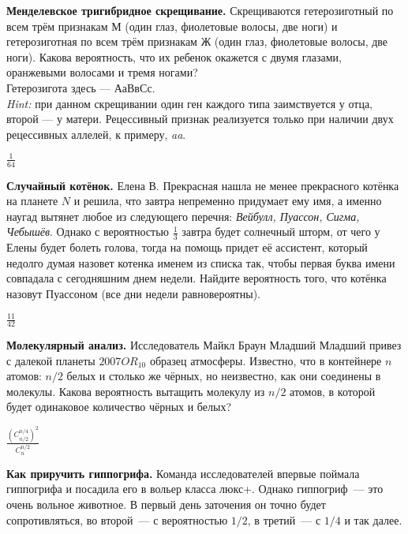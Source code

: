 \documentclass[12pt, addpoints]{exam} %
\begin{document}
\begin{questions}

\question \textbf{Менделевское тригибридное скрещивание.} Скрещиваются гетерозиготный по всем трём признакам М (один глаз, фиолетовые волосы, две ноги) и гетерозиготная по всем трём признакам Ж (один глаз, фиолетовые волосы, две ноги). Какова вероятность, что их ребенок окажется с двумя глазами, оранжевыми волосами и тремя ногами?\\
Гетерозигота здесь --- АаВвСс. \\
{\it Hint:} при данном скрещивании один ген каждого типа заимствуется у отца, второй --- у матери. Рецессивный признак реализуется только при наличии двух рецессивных аллелей, к примеру, {\it aa}.

\begin{solution}
 $\frac{1}{64}$
\end{solution}

\question \textbf{Случайный котёнок.} Елена В. Прекрасная нашла не менее прекрасного котёнка на планете $N$ и решила, что завтра непременно придумает ему имя, а именно наугад вытянет любое из следующего перечня: {\it Вейбулл, Пуассон, Сигма, Чебышёв}.
Однако с вероятностью $\frac{1}{3}$ завтра будет солнечный шторм, от чего у Елены будет болеть голова, тогда на помощь придет её ассистент, который недолго думая назовет котенка именем из списка так, чтобы первая буква имени совпадала с сегодняшним днем недели. Найдите вероятность того, что котёнка назовут Пуассоном (все дни недели равновероятны).

\begin{solution}
 $\frac{11}{42}$
\end{solution}

\question \textbf{Молекулярный анализ.} Исследователь Майкл Браун Младший Младший привез с далекой планеты  $2007 OR_{10}$ образец атмосферы. Известно, что в контейнере $n$ атомов: $n/2$ белых и столько же чёрных, но неизвестно, как они соединены в молекулы. Какова вероятность вытащить молекулу из $n/2$ атомов, в которой будет одинаковое количество чёрных и белых?

\begin{solution} $\frac{(C^{n/4}_{n/2})^2}{C_{n}^{n/2}}$
\end{solution}

\question \textbf{Как приручить гиппогрифа.} Команда исследователей впервые поймала гиппогрифа и посадила его в вольер класса люкс+. Однако гиппогриф~--- это очень вольное животное. В первый день заточения он точно будет сопротивляться, во второй~--- с вероятностью $1/2$, в третий~--- с $1/4$ и так далее.


\end{questions}
\end{document}

